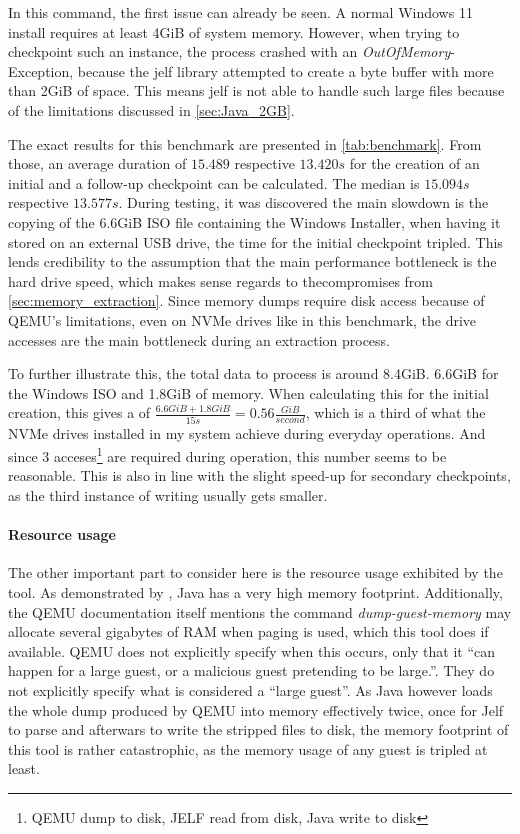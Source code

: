 In this command, the first issue can already be seen.
A normal Windows 11 install requires at least 4GiB of system memory.
However, when trying to checkpoint such an instance, the process crashed with an \emph{OutOfMemory}-Exception,
because the jelf library\cite{jelf} attempted to create a byte buffer with more than 2GiB of space.
This means jelf is not able to handle such large files because of the limitations discussed in \autoref{sec:Java_2GB}.

The exact results for this benchmark are presented in \autoref{tab:benchmark}.
From those, an average duration of $15.489$ respective $13.420s$ for the creation of an initial and a follow-up checkpoint can be calculated.
The median is $15.094s$ respective $13.577s$.
During testing, it was discovered the main slowdown is the copying of the 6.6GiB ISO file containing the Windows Installer,
when having it stored on an external USB drive, the time for the initial checkpoint tripled.
This lends credibility to the assumption that the main performance bottleneck is the hard drive speed,
which makes sense regards to thecompromises from \autoref{sec:memory_extraction}.
Since memory dumps require disk access because of QEMU's limitations,
even on NVMe drives like in this benchmark, the drive accesses are the main bottleneck during an extraction process.

To further illustrate this, the total data to process is around 8.4GiB. 6.6GiB for the Windows ISO and 1.8GiB of memory.
When calculating this for the initial creation, this gives a  of $\frac{6.6GiB + 1.8 GiB}{15s}=0.56\frac{GiB}{second}$,
which is a third of what the NVMe drives installed in my system achieve during everyday operations.
And since 3 acceses\footnote{QEMU dump to disk, JELF read from disk, Java write to disk} are required during operation,
this number seems to be reasonable.
This is also in line with the slight speed-up for secondary checkpoints, as the third instance of writing usually gets smaller.

\paragraph{Resource usage} The other important part to consider here is the resource usage exhibited by the tool.
As demonstrated by ,
Java has a very high memory footprint\cite{Java_Performance}.
Additionally, the QEMU documentation itself mentions the command \emph{dump-guest-memory}
may allocate several gigabytes of RAM when paging is used,
which this tool does if available.
QEMU does not explicitly specify when this occurs,
only that it \enquote{can happen for a large guest, or a malicious guest pretending to be large.}\cite{qmp-commands}.
They do not explicitly specify what is considered a \enquote{large guest}.
As Java however loads the whole dump produced by QEMU into memory effectively twice,
once for Jelf to parse and afterwars to write the stripped files to disk,
the memory footprint of this tool is rather catastrophic,
as the memory usage of any guest is tripled at least.

